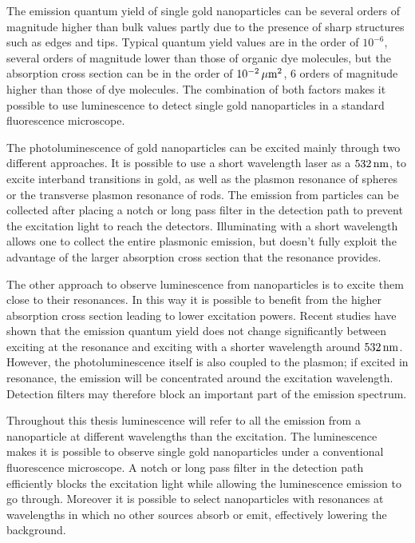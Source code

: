 The emission quantum yield of single gold nanoparticles can be several orders of
magnitude higher than bulk values partly due to the presence of sharp structures
such as edges and tips. Typical quantum yield values are in the order of
$10^{-6}$\cite{Yorulmaz2012}, several orders of magnitude lower than those of
organic dye molecules, but the absorption cross section can be in the order of
$10^{-2}\,\mu\textrm{m}^2$, $6$ orders of magnitude higher than those of dye molecules. The
combination of both factors makes it possible to use luminescence to detect
single gold nanoparticles in a standard fluorescence microscope.

The photoluminescence of gold nanoparticles can be excited mainly through two
different approaches. It is possible to use a short wavelength laser as a
$532\,\textrm{nm}$, to excite interband transitions in gold\cite{Beversluis2003a}, as well
as the plasmon resonance of spheres or the transverse plasmon resonance of rods.
The emission from particles can be collected after placing a notch or long pass
filter in the detection path to prevent the excitation light to reach the
detectors. Illuminating with a short wavelength allows one to collect the entire
plasmonic emission, but doesn't fully exploit the advantage of the larger
absorption cross section that the resonance provides.

The other approach to observe luminescence from nanoparticles is to excite them
close to their resonances. In this way it is possible to benefit from the higher
absorption cross section leading to lower excitation powers. Recent studies have
shown that the emission quantum yield does not change significantly between
exciting at the resonance and exciting with a shorter wavelength around
$532\,\textrm{nm}$\cite{Cheng2015}. However, the photoluminescence itself is also coupled
to the plasmon; if excited in resonance, the emission will be concentrated
around the excitation wavelength\cite{Sundararaman2014}. Detection filters may
therefore block an important part of the emission spectrum.

Throughout this thesis luminescence will refer to all the emission from a
nanoparticle at different wavelengths than the excitation. The luminescence
makes it is possible to observe single gold nanoparticles under a conventional
fluorescence microscope. A notch or long pass filter in the detection path
efficiently blocks the excitation light while allowing the luminescence emission
to go through. Moreover it is possible to select nanoparticles with resonances
at wavelengths in which no other sources absorb or emit, effectively lowering
the background.

